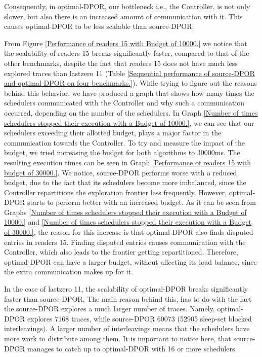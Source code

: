 Consequently, in optimal-DPOR, our bottleneck i.e., the Controller, is not only slower, but also there is an increased amount of communication with it. This causes optimal-DPOR to be less scalable than source-DPOR.

From Figure \ref{Performance of readers 15 with Budget of 10000.} we notice that the scalability 
of readers 15 breaks significantly faster,
compared to that of the other benchmarks, despite the fact that readers 15 does not have much less explored traces than lastzero 11
(Table \ref{Sequential performance of source-DPOR and optimal-DPOR on four benchmarks.}). 
While trying to figure out the reasons behind this behavior, we have produced a graph that shows how many times the schedulers communicated with the Controller and why such a communication occurred, depending on the number of the schedulers. In Graph \ref{Number of times schedulers stopped their execution with a Budget of 10000.},
we can see that our schedulers exceeding their allotted budget, plays a major factor in the communication towards the Controller.
To try and measure the impact of the budget, we tried increasing the budget for both algorithms to 30000ms. The resulting execution times can be seen in Graph \ref{Performance of readers 15 with budget of 30000.}. We notice, source-DPOR performs worse with a reduced budget, due to the fact that its schedulers become more imbalanced, since the Controller repartitions the exploration frontier less frequently.
However, optimal-DPOR starts to perform better with an increased budget. As it can be seen from Graphs 
\ref{Number of times schedulers stopped their execution with a Budget of 10000.} and \ref{Number of times schedulers stopped their execution with a Budget of 30000.}, the reason for this increase is that optimal-DPOR also finds disputed entries in readers 15. Finding disputed entries causes communication with the Controller, which also leads to the frontier getting repartitioned. Therefore, optimal-DPOR can have a larger budget, without affecting its load balance, since the extra communication makes up for it.


In the case of lastzero 11, the scalability of optimal-DPOR breaks significantly faster than source-DPOR. The main reason behind this, has to do with the fact the source-DPOR explores a much larger number of traces. Namely, optimal-DPOR explores 7168 traces, while source-DPOR 60073 (52905 sleep-set blocked interleavings). A larger number of interleavings means that the schedulers have more work to distribute among them. It is important to notice here, that source-DPOR manages to catch up to optimal-DPOR with 16 or more schedulers.

